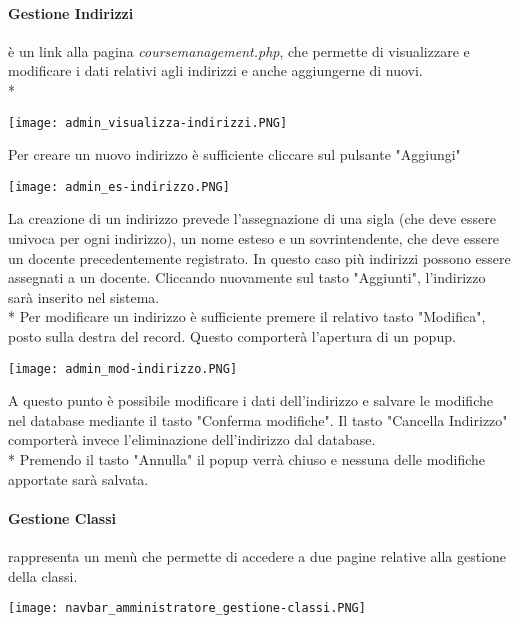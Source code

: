 \documentclass[12pt]{article}
\begin{document}
\paragraph{Gestione Indirizzi} è un link alla pagina \textit{coursemanagement.php}, che permette di visualizzare e modificare i dati relativi agli indirizzi e anche aggiungerne di nuovi.\\*

\begin{center}
    \texttt{[image: admin\_visualizza-indirizzi.PNG]}
\end{center}
Per creare un nuovo indirizzo è sufficiente cliccare sul pulsante "Aggiungi"
\begin{center}
    \texttt{[image: admin\_es-indirizzo.PNG]}
\end{center}
La creazione di un indirizzo prevede l'assegnazione di una sigla (che deve essere univoca per ogni indirizzo), un nome esteso e un sovrintendente, che deve essere un docente precedentemente registrato. In questo caso più indirizzi possono essere assegnati a un docente. Cliccando nuovamente sul tasto "Aggiunti", l'indirizzo sarà inserito nel sistema.\\*
Per modificare un indirizzo è sufficiente premere il relativo tasto "Modifica", posto sulla destra del record. Questo comporterà l'apertura di un popup.

\begin{center}
    \texttt{[image: admin\_mod-indirizzo.PNG]}
\end{center}
A questo punto è possibile modificare i dati dell'indirizzo e salvare le modifiche nel database mediante il tasto "Conferma modifiche". Il tasto "Cancella Indirizzo" comporterà invece l'eliminazione dell'indirizzo dal database.\\*
Premendo il tasto "Annulla" il popup verrà chiuso e nessuna delle modifiche apportate sarà salvata.
\bigskip


\paragraph{Gestione Classi} rappresenta un menù che permette di accedere a due pagine relative alla gestione della classi.
\begin{center}
    \texttt{[image: navbar\_amministratore\_gestione-classi.PNG]}
\end{center}
\end{document}
